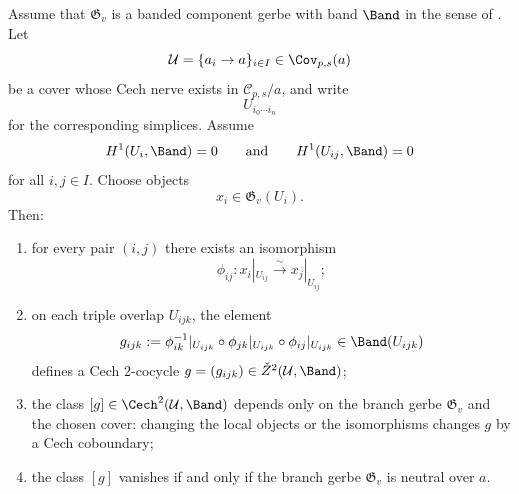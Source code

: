 \begin{theorem}\label{thm:cech-bridge-compatible-realizations}
Assume that $\mathfrak G_v$ is a banded component gerbe with band $\Band$ in the sense of . Let
\[
\mathcal U=\{a_i\to a\}_{i\in I}\in \Cov_{p,s}(a)
\]
be a cover whose Cech nerve exists in $\mathcal C_{p,s}/a$, and write
\[
U_{i_0\cdots i_n}
\]
for the corresponding simplices. Assume
\[
H^1(U_i,\Band)=0
\qquad\text{and}\qquad
H^1(U_{ij},\Band)=0
\]
for all $i,j\in I$. Choose objects
\[
x_i\in \mathfrak G_v(U_i).
\]
Then:
\begin{enumerate}[label=(\roman*),nosep]
\item for every pair $(i,j)$ there exists an isomorphism
\[
\phi_{ij}:x_i|_{U_{ij}}\xrightarrow{\sim} x_j|_{U_{ij}};
\]
\item on each triple overlap $U_{ijk}$, the element
\[
g_{ijk}:=\phi_{ik}^{-1}|_{U_{ijk}}\circ \phi_{jk}|_{U_{ijk}}\circ \phi_{ij}|_{U_{ijk}}
\in \Band(U_{ijk})
\]
defines a Cech $2$-cocycle $g=(g_{ijk})\in \check Z^2(\mathcal U,\Band)$;
\item the class $[g]\in \Cech^2(\mathcal U,\Band)$ depends only on the branch gerbe $\mathfrak G_v$ and the chosen cover: changing the local objects or the isomorphisms changes $g$ by a Cech coboundary;
\item the class $[g]$ vanishes if and only if the branch gerbe $\mathfrak G_v$ is neutral over $a$.
\end{enumerate}
\end{theorem}

